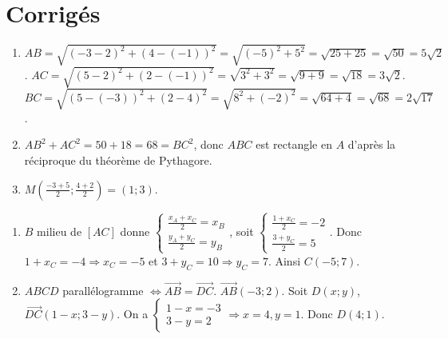 \section{Corrigés}

\begin{enumerate}[label=\alph*)]
    \item $AB = \sqrt{( -3 - 2)^2 + (4 - (-1))^2} = \sqrt{(-5)^2 + 5^2} = \sqrt{25 + 25} = \sqrt{50} = 5\sqrt{2}$.
    $AC = \sqrt{(5 - 2)^2 + (2 - (-1))^2} = \sqrt{3^2 + 3^2} = \sqrt{9 + 9} = \sqrt{18} = 3\sqrt{2}$.
    $BC = \sqrt{(5 - (-3))^2 + (2 - 4)^2} = \sqrt{8^2 + (-2)^2} = \sqrt{64 + 4} = \sqrt{68} = 2\sqrt{17}$.
    \item $AB^2 + AC^2 = 50 + 18 = 68 = BC^2$, donc $ABC$ est rectangle en $A$ d'après la réciproque du théorème de Pythagore.
    \item $M\left(\frac{-3 + 5}{2}; \frac{4 + 2}{2}\right) = (1; 3)$.
\end{enumerate}

\begin{enumerate}[label=\alph*)]
    \item $B$ milieu de $[AC]$ donne $\begin{cases} \frac{x_A + x_C}{2} = x_B \\ \frac{y_A + y_C}{2} = y_B \end{cases}$, soit $\begin{cases} \frac{1 + x_C}{2} = -2 \\ \frac{3 + y_C}{2} = 5 \end{cases}$. Donc $1 + x_C = -4 \Rightarrow x_C = -5$ et $3 + y_C = 10 \Rightarrow y_C = 7$. Ainsi $C(-5; 7)$.
    \item $ABCD$ parallélogramme $\Leftrightarrow \overrightarrow{AB} = \overrightarrow{DC}$. $\overrightarrow{AB}(-3; 2)$. Soit $D(x; y)$, $\overrightarrow{DC}(1 - x; 3 - y)$. On a $\begin{cases} 1 - x = -3 \\ 3 - y = 2 \end{cases} \Rightarrow x = 4, y = 1$. Donc $D(4; 1)$.
\end{enumerate}

